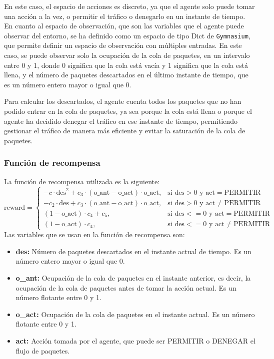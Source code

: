 En este caso, el espacio de acciones es discreto, ya que el agente solo puede tomar una acción a la vez, o permitir el tráfico o denegarlo en un instante de tiempo. En cuanto al espacio de observación, que son las variables que el agente puede observar del entorno, se ha definido como un espacio de tipo Dict de \texttt{Gymnasium}, que permite definir un espacio de observación con múltiples entradas. En este caso, se puede observar solo la ocupación de la cola de paquetes, en un intervalo entre 0 y 1, donde 0 significa que la cola está vacía y 1 significa que la cola está llena, y el número de paquetes descartados en el último instante de tiempo, que es un número entero mayor o igual que 0.

Para calcular los descartados, el agente cuenta todos los paquetes que no han podido entrar en la cola de paquetes, ya sea porque la cola está llena o porque el agente ha decidido denegar el tráfico en ese instante de tiempo, permitiendo gestionar el tráfico de manera más eficiente y evitar la saturación de la cola de paquetes.

\subsubsection{Función de recompensa}
La función de recompensa utilizada es la siguiente: 
\[
\text{reward} = 
\begin{cases}
    -c \cdot \text{des}^2 + c_3 \cdot (\text{o\_ant} - \text{o\_act}) \cdot \text{o\_act}, & \text{si } \text{des} > 0 \text{ y } \text{act} = \text{PERMITIR} \\
    -c_2 \cdot \text{des} + c_3 \cdot (\text{o\_ant} - \text{o\_act}) \cdot \text{o\_act}, & \text{si } \text{des} > 0 \text{ y } \text{act} \ne \text{PERMITIR} \\
    (1 - \text{o\_act}) \cdot c_4 + c_5, & \text{si } \text{des} <= 0 \text{ y } \text{act} = \text{PERMITIR} \\
    (1 - \text{o\_act}) \cdot c_4, & \text{si } \text{des} <= 0 \text{ y } \text{act} \ne \text{PERMITIR}
\end{cases}
\]
Las variables que se usan en la función de recompensa son:
\begin{itemize}
    \item \textbf{des:} Número de paquetes descartados en el instante actual de tiempo. Es un número entero mayor o igual que 0.
    \item \textbf{o\_ant:} Ocupación de la cola de paquetes en el instante anterior, es decir, la ocupación de la cola de paquetes antes de tomar la acción actual. Es un número flotante entre 0 y 1.
    \item \textbf{o\_act:} Ocupación de la cola de paquetes en el instante actual. Es un número flotante entre 0 y 1.
    \item \textbf{act:} Acción tomada por el agente, que puede ser PERMITIR o DENEGAR el flujo de paquetes.
\end{itemize}

